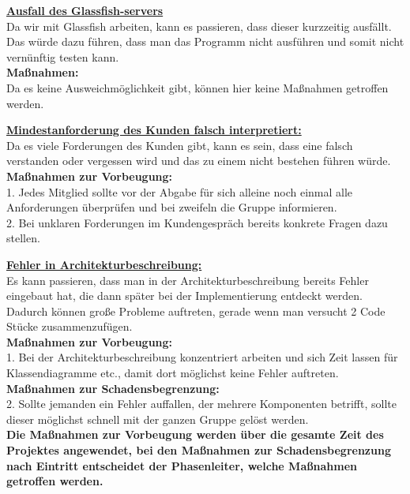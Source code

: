 \documentclass[fontsize=12pt,paper=a4,twoside]{scrartcl}
\begin{document}
\bigskip

\textbf{\underline{Ausfall des Glassfish-servers}}\\
Da wir mit Glassfish arbeiten, kann es passieren, dass dieser kurzzeitig ausfällt. Das würde dazu führen, dass man das Programm nicht ausführen und somit nicht vernünftig testen kann.\\
\textbf{Maßnahmen:}\\
Da es keine Ausweichmöglichkeit gibt, können hier keine Maßnahmen getroffen werden.\\

\bigskip 

\textbf{\underline{Mindestanforderung des Kunden falsch interpretiert:}}\\
Da es viele Forderungen des Kunden gibt, kann es sein, dass eine falsch verstanden oder vergessen wird und das zu einem nicht bestehen führen würde.\\
\textbf{Maßnahmen zur Vorbeugung:}\\
1. Jedes Mitglied sollte vor der Abgabe für sich alleine noch einmal alle Anforderungen überprüfen und bei zweifeln die Gruppe informieren.\\
2. Bei unklaren Forderungen im Kundengespräch bereits konkrete Fragen dazu stellen.\\

\bigskip

\textbf{\underline{Fehler in Architekturbeschreibung:}}\\
Es kann passieren, dass man in der Architekturbeschreibung bereits Fehler eingebaut hat, die dann später bei der Implementierung entdeckt werden. Dadurch können große Probleme auftreten, gerade wenn man versucht 2 Code Stücke zusammenzufügen.\\
\textbf{Maßnahmen zur Vorbeugung:}\\
1. Bei der Architekturbeschreibung konzentriert arbeiten und sich Zeit lassen für Klassendiagramme etc., damit dort möglichst keine Fehler auftreten.\\
\textbf{Maßnahmen zur Schadensbegrenzung:}\\
2. Sollte jemanden ein Fehler auffallen, der mehrere Komponenten betrifft, sollte dieser möglichst schnell mit der ganzen Gruppe gelöst werden.\\ 

\bigskip 
\textbf{Die Maßnahmen zur Vorbeugung werden über die gesamte Zeit des Projektes angewendet, bei den Maßnahmen zur Schadensbegrenzung nach Eintritt entscheidet der Phasenleiter, welche Maßnahmen getroffen werden.}\\
\bigskip 
\end{document}
